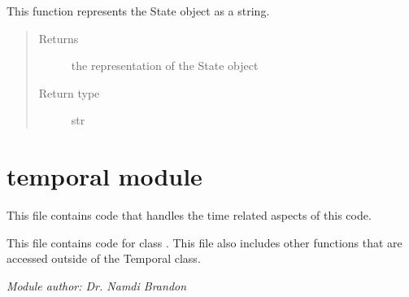 \documentclass[letterpaper,10pt,english]{sphinxmanual}
\begin{document}
\begin{fulllineitems}
\begin{fulllineitems}
\end{fulllineitems}


\begin{fulllineitems}
\label{state:state.State.toString}
This function represents the State object as a string.
\begin{quote}\begin{description}
\item[{Returns}] \leavevmode
the representation of the State object

\item[{Return type}] \leavevmode
str

\end{description}\end{quote}

\end{fulllineitems}


\end{fulllineitems}



\section{temporal module}
\label{temporal::doc}\label{temporal:temporal-module}\label{temporal:module-temporal}
This file contains code that handles the time related aspects of this code.

This file contains code for class {\hyperref[temporal:temporal.Temporal]{\emph{}}}. This file also includes other functions that are accessed outside of the Temporal class.

\emph{Module author: Dr. Namdi Brandon}
\end{document}
